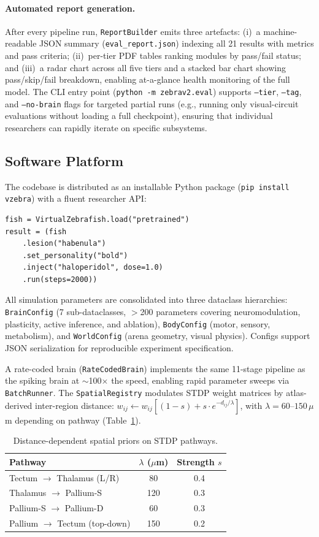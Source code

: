 \documentclass[12pt]{article}
\begin{document}
\paragraph{Automated report generation.}
After every pipeline run, \texttt{ReportBuilder} emits three artefacts:
(i)~a machine-readable JSON summary (\texttt{eval\_report.json})
indexing all 21 results with metrics and pass criteria;
(ii)~per-tier PDF tables ranking modules by pass/fail status; and
(iii)~a radar chart across all five tiers and a stacked bar chart
showing pass/skip/fail breakdown, enabling at-a-glance health
monitoring of the full model.
The CLI entry point (\texttt{python -m zebrav2.eval}) supports
\texttt{--tier}, \texttt{--tag}, and \texttt{--no-brain} flags for
targeted partial runs (e.g., running only visual-circuit evaluations
without loading a full checkpoint), ensuring that individual
researchers can rapidly iterate on specific subsystems.

\subsection{Software Platform}\label{sec:platform}

The codebase is distributed as an installable Python package (\texttt{pip install vzebra})
with a fluent researcher API:
\begin{verbatim}
fish = VirtualZebrafish.load("pretrained")
result = (fish
    .lesion("habenula")
    .set_personality("bold")
    .inject("haloperidol", dose=1.0)
    .run(steps=2000))
\end{verbatim}
\noindent
All simulation parameters are consolidated into three dataclass hierarchies:
\texttt{BrainConfig} (7 sub-dataclasses, $>$200 parameters covering
neuromodulation, plasticity, active inference, and ablation),
\texttt{BodyConfig} (motor, sensory, metabolism), and
\texttt{WorldConfig} (arena geometry, visual physics).
Configs support JSON serialization for reproducible experiment specification.

A rate-coded brain (\texttt{RateCodedBrain}) implements the same 11-stage
pipeline as the spiking brain at $\sim$100$\times$ the speed, enabling
rapid parameter sweeps via \texttt{BatchRunner}.
The \texttt{SpatialRegistry} modulates STDP weight matrices by
atlas-derived inter-region distance:
$w_{ij} \leftarrow w_{ij}[(1-s) + s \cdot e^{-d_{ij}/\lambda}]$,
with $\lambda = 60$--$150\,\mu$m depending on pathway (Table~\ref{tab:spatial}).

\begin{table}[H]
\centering
\caption{Distance-dependent spatial priors on STDP pathways.}
\label{tab:spatial}
\small
\begin{tabular}{lcc}
\toprule
Pathway & $\lambda$ ($\mu$m) & Strength $s$ \\
\midrule
Tectum $\to$ Thalamus (L/R) & 80 & 0.4 \\
Thalamus $\to$ Pallium-S     & 120 & 0.3 \\
Pallium-S $\to$ Pallium-D    & 60 & 0.3 \\
Pallium $\to$ Tectum (top-down) & 150 & 0.2 \\
\bottomrule
\end{tabular}
\end{table}
\end{document}
